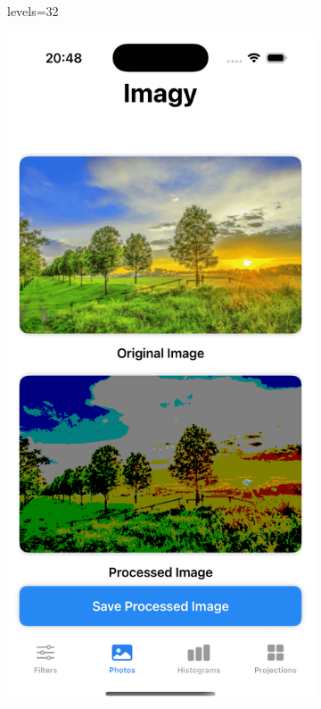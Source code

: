 \documentclass[a4paper]{article}
\begin{document}
\begin{figure}[H]
\begin{subfigure}{0.2\textwidth}
        \caption{levels=32}
        \label{fig:trees_posterize_32}
    \end{subfigure}
    \hfill
    \begin{subfigure}{0.2\textwidth}
        \centering
        \includegraphics[width=\linewidth]{images/trees_posterize_86.png}

\end{subfigure}
\end{figure}
\end{document}
